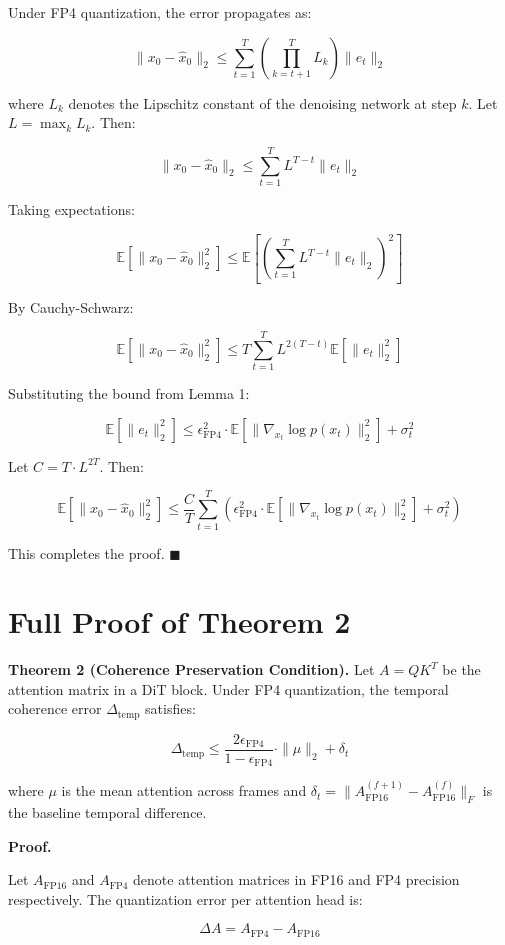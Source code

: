 \documentclass[journal,twoside]{IEEEtran}
\theoremstyle{definition}
\theoremstyle{remark}
\newcommand{\EE}{\mathbb{E}}
\begin{document}
Under FP4 quantization, the error propagates as:

\[
\|x_0 - \hat{x}_0\|_2 \leq \sum_{t=1}^T \left( \prod_{k=t+1}^T L_k \right) \|e_t\|_2
\]

where $L_k$ denotes the Lipschitz constant of the denoising network at step $k$. Let $L = \max_k L_k$. Then:

\[
\|x_0 - \hat{x}_0\|_2 \leq \sum_{t=1}^T L^{T-t} \|e_t\|_2
\]

Taking expectations:

\[
\EE[\|x_0 - \hat{x}_0\|_2^2] \leq \EE\left[\left(\sum_{t=1}^T L^{T-t} \|e_t\|_2\right)^2\right]
\]

By Cauchy-Schwarz:

\[
\EE[\|x_0 - \hat{x}_0\|_2^2] \leq T \sum_{t=1}^T L^{2(T-t)} \EE[\|e_t\|_2^2]
\]

Substituting the bound from Lemma 1:

\[
\EE[\|e_t\|_2^2] \leq \epsilon_{\text{FP4}}^2 \cdot \EE[\|\nabla_{x_t} \log p(x_t)\|_2^2] + \sigma_t^2
\]

Let $C = T \cdot L^{2T}$. Then:

\[
\EE[\|x_0 - \hat{x}_0\|_2^2] \leq \frac{C}{T} \sum_{t=1}^T \left( \epsilon_{\text{FP4}}^2 \cdot \EE[\|\nabla_{x_t} \log p(x_t)\|_2^2] + \sigma_t^2 \right)
\]

This completes the proof. \hfill $\blacksquare$

\section{Full Proof of Theorem 2}
\label{app:b}

\textbf{Theorem 2 (Coherence Preservation Condition).}
Let $A = QK^T$ be the attention matrix in a DiT block. Under FP4 quantization, the temporal coherence error $\Delta_{\text{temp}}$ satisfies:

\[
\Delta_{\text{temp}} \leq \frac{2\epsilon_{\text{FP4}}}{1 - \epsilon_{\text{FP4}}} \cdot \|\mu\|_2 + \delta_t
\]

where $\mu$ is the mean attention across frames and $\delta_t = \|A_{\text{FP16}}^{(f+1)} - A_{\text{FP16}}^{(f)}\|_F$ is the baseline temporal difference.

\textbf{Proof.}

Let $A_{\text{FP16}}$ and $A_{\text{FP4}}$ denote attention matrices in FP16 and FP4 precision respectively. The quantization error per attention head is:

\[
\Delta A = A_{\text{FP4}} - A_{\text{FP16}}
\]
\end{document}
